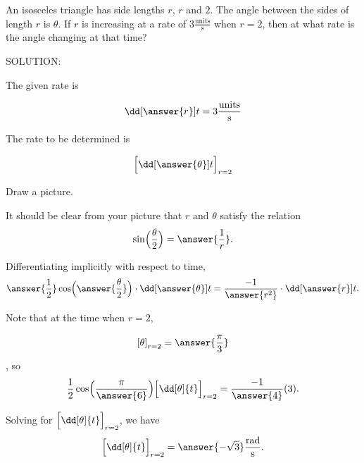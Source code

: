 \documentclass{ximera}
\author{Steven Gubkin\and Nela Lakos}
\begin{document}
\begin{exercise}

An isosceles triangle has side lengths $r$, $r$ and $2$.  The angle
between the sides of length $r$ is $\theta$.  If $r$ is increasing at
a rate of $3 \frac{\textrm{units}}{\textrm{s}}$ when $r = 2$, then at
what rate is the angle changing at that time?

SOLUTION:

The given rate is  

\[
 \dd[\answer{r}]{t}=3 \frac{\textrm{units}}{\textrm{s}}
\]

The rate to be determined is  

\[
\Bigl[ \dd[\answer{\theta}]{t}\Bigr]_{r=2}
\]


  Draw a picture.
\begin{hint}

  
  \begin{hint}
\begin{image}
\end{image}
\end{hint}

\end{hint}


  It should be clear from your picture that $r$ and $\theta$ satisfy the relation 
  \[
  \sin\Bigl(\frac{\theta}{2}\Bigr) = \answer{\frac{1}{r}}.
  \]



  Differentiating implicitly with respect to time, 
  \[
  \answer{\frac{1}{2}}\cos\Bigl(\answer{\frac{\theta}{2}}\Bigr) \cdot \dd[\answer{\theta}]{t} = \frac{-1}{\answer{r^2}}\cdot
  \dd[\answer{r}]{t}.
  \]



  Note that at the time when $r = 2$, 
  
  \[
 \left[ \theta \right]_{r=2}=\answer{ \frac{\pi}{3}}
  \]
  , so
  \[
  \frac{1}{2} \cos\Bigl(\frac{\pi}{\answer{6}}\Bigr)\Bigl[ \dd[\theta]{t}\Bigr]_{r=2} = \frac{-1}{\answer{4}} (3).
  \]



  Solving for $\Bigl[ \dd[\theta]{t}\Bigr]_{r=2} $, we have
  \[
\Bigl[ \dd[\theta]{t}\Bigr]_{r=2}  = \answer{-\sqrt{3}}\frac{\textrm{rad}}{\textrm{s}}.
  \]


\end{exercise}
\end{document}
